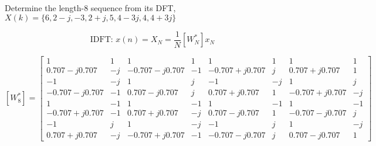 \documentclass{article}
\begin{document}
Determine the length-8 sequence from its DFT, $X(k) = \{6, 2-j, -3, 2+j, 5, 4-3j, 4, 4+3j\}$

\[
\text{IDFT: } x(n) = X_N = \frac{1}{N} [W_N^*] x_N
\]

\[
[W_8^*] = 
\begin{bmatrix}
1 & 1 & 1 & 1 & 1 & 1 & 1 & 1 \\
0.707-j0.707 & -j & -0.707-j0.707 & -1 & -0.707+j0.707 & j & 0.707+j0.707 & 1 \\
-1 & -j & 1 & j & -1 & -j & 1 & j \\
-0.707-j0.707 & -1 & 0.707-j0.707 & j & 0.707+j0.707 & 1 & -0.707+j0.707 & -j \\
1 & -1 & 1 & -1 & 1 & -1 & 1 & -1 \\
-0.707+j0.707 & -1 & 0.707+j0.707 & -j & 0.707-j0.707 & 1 & -0.707-j0.707 & j \\
-1 & j & 1 & -j & -1 & j & 1 & -j \\
0.707+j0.707 & -j & -0.707+j0.707 & -1 & -0.707-j0.707 & j & 0.707-j0.707 & 1
\end{bmatrix}
\]
\end{document}
